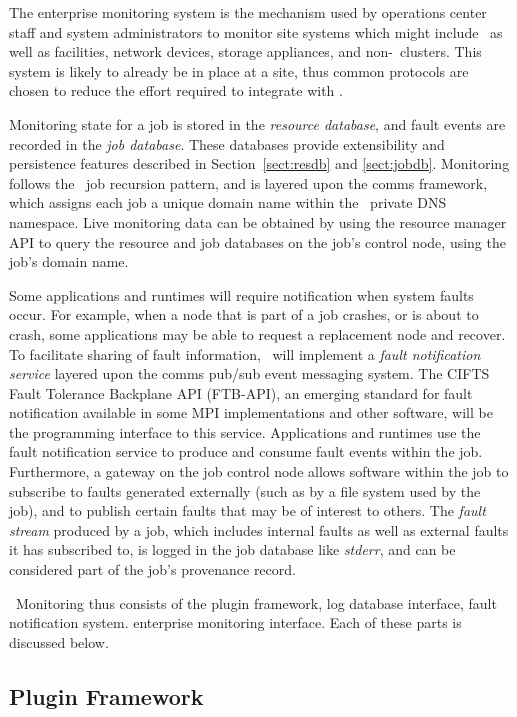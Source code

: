 The enterprise monitoring system is the mechanism used by operations center
staff and system administrators to monitor site systems which might include
\ngrm\ as well as facilities, network devices, storage appliances,
and non-\ngrm\ clusters.
This system is likely to already be in place at a site, thus common
protocols are chosen to reduce the effort required to integrate with \ngrm.

Monitoring state for a job is stored in the {\em resource database}, and
fault events are recorded in the {\em job database}.
These databases provide extensibility and persistence features described
in Section~\ref{sect:resdb} and \ref{sect:jobdb}.
Monitoring follows the \ngrm\ job recursion pattern, and is layered upon
the comms framework, which assigns each job a unique domain name within
the \ngrm\ private DNS namespace.
Live monitoring data can be obtained by using the resource
manager API to query the resource and job databases on the job's control
node, using the job's domain name.

Some applications and runtimes will require notification when system faults
occur.  For example, when a node that is part of a job crashes, or is about to
crash, some applications may be able to request a replacement node and recover.
To facilitate sharing of fault information, \ngrm\ will implement a
{\em fault notification service} layered upon the comms pub/sub event
messaging system.
The CIFTS Fault Tolerance Backplane API\cite{FTBAPI} (FTB-API), an emerging
standard for fault notification available in some MPI implementations and
other software, will be the programming interface to this service.
Applications and runtimes use the fault notification service to produce
and consume fault events within the job.  Furthermore, a gateway on the
job control node allows software within the job to subscribe to faults
generated externally (such as by a file system used by the job), and to
publish certain faults that may be of interest to others.
The {\em fault stream} produced by a job, which includes internal faults
as well as external faults it has subscribed to, is logged in the job database
like {\em stderr}, and can be considered part of the job's provenance record.

\ngrm\ Monitoring thus consists of
the plugin framework, 
log database interface,
fault notification system.
enterprise monitoring interface.
Each of these parts is discussed below.

\subsection{Plugin Framework}

